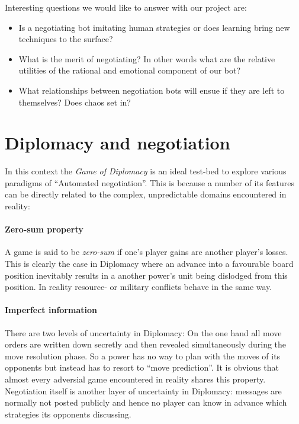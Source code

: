 \documentclass[pdftex,12pt,a4paper]{report}
\begin{document}
Interesting questions we would like to answer with our project are:

\begin{itemize}

\item Is a negotiating bot imitating human strategies or does 
      learning bring new techniques to the surface?

\item What is the merit of negotiating? In other words what 
      are the relative utilities of the rational and emotional
      component of our bot?

\item What relationships between negotiation bots will ensue 
      if they are left to themselves? Does chaos set in?


\end{itemize}

\section{Diplomacy and negotiation}

In this context the \textit{Game of Diplomacy} is an ideal test-bed to
explore various paradigms of ``Automated negotiation''. This is
because a number of its features can be directly related to the
complex, unpredictable domains encountered in reality:

\paragraph{Zero-sum property}
A game is said to be \textit{zero-sum} if one's player gains are
another player's losses. This is clearly the case in Diplomacy where
an advance into a favourable board position inevitably results in a
another power's unit being dislodged from this position. In reality
resource- or military conflicts behave in the same way.

\paragraph{Imperfect information}
There are two levels of uncertainty in Diplomacy: On the one hand all
move orders are written down secretly and then revealed simultaneously
during the move resolution phase. So a power has no way to plan with
the moves of its opponents but instead has to resort to ``move
prediction''. It is obvious that almost every adversial game
encountered in reality shares this property. Negotiation itself is
another layer of uncertainty in Diplomacy: messages are normally not
posted publicly and hence no player can know in advance which
strategies its opponents discussing.
\end{document}
